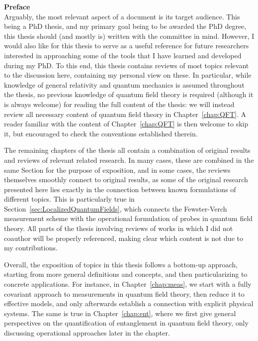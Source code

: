 \documentclass[letterpaper,12pt,titlepage,oneside,final]{book}
\begin{document}
{\Huge\noindent\textbf{Preface}}\\

\noindent Arguably, the most relevant aspect of a document is its target audience. This being a PhD thesis, and my primary goal being to be awarded the PhD degree, this thesis should (and mostly is) written with the committee in mind. However, I would also like for this thesis to serve as a useful reference for future researchers interested in approaching some of the tools that I have learned and developed during my PhD. To this end, this thesis contains reviews of most topics relevant to the discussion here, containing my personal view on these. In particular, while knowledge of general relativity and quantum mechanics is assumed throughout the thesis, no previous knowledge of quantum field theory is required (although it is always welcome) for reading the full content of the thesis: we will instead review all necessary content of quantum field theory in Chapter~\ref{chap:QFT}. A reader familiar with the content of Chapter~\ref{chap:QFT} is then welcome to skip it, but encouraged to check the conventions established therein.

The remaining chapters of the thesis all contain a combination of original results and reviews of relevant related research. In many cases, these are combined in the same Section for the purpose of exposition, and in some cases, the reviews themselves smoothly connect to original results, as some of the original research presented here lies exactly in the connection between known formulations of different topics. This is particularly true in Section~\ref{sec:LocalizedQuantumFields}, which connects the Fewster-Verch measurement scheme with the operational formulation of probes in quantum field theory. All parts of the thesis involving reviews of works in which I did not coauthor will be properly referenced, making clear which content is not due to my contributions.

Overall, the exposition of topics in this thesis follows a bottom-up approach, starting from more general definitions and concepts, and then particularizing to concrete applications. For instance, in Chapter~\ref{chap:meas}, we start with a fully covariant approach to measurements in quantum field theory, then reduce it to effective models, and only afterwards establish a connection with explicit physical systems. The same is true in Chapter~\ref{chap:ent}, where we first give general perspectives on the quantification of entanglement in quantum field theory, only discussing operational approaches later in the chapter.
\end{document}
